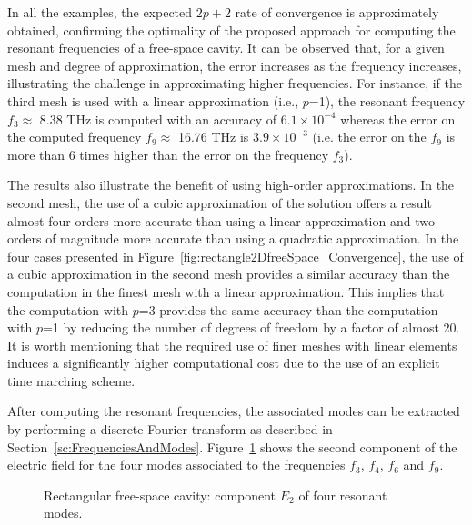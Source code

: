 In all the examples, the expected $2p+2$
rate of convergence is approximately obtained, confirming the optimality of the proposed approach for computing the resonant frequencies of a free-space cavity. It can be observed that, for a given mesh and degree of approximation, the error increases as the frequency increases, illustrating the challenge in approximating higher frequencies. For instance, if the third mesh is used with a linear approximation (i.e., $p$=1), the resonant frequency $f_3 \approx$  8.38 THz is computed with an accuracy of $6.1 \times 10^{-4}$ whereas the error on the computed frequency $f_9 \approx$ 16.76 THz is $3.9 \times 10^{-3}$ (i.e. the error on the $f_9$ is more than 6 times higher than the error on the frequency $f_3$).

The results also illustrate the benefit of using high-order approximations. In the second mesh, the use of a cubic approximation of the solution offers a result almost four orders more accurate than using a linear approximation and two orders of magnitude more accurate than using a quadratic approximation. In the four cases presented in Figure~\ref{fig:rectangle2DfreeSpace_Convergence}, the use of a cubic approximation in the second mesh provides a similar accuracy than the computation in the finest mesh with a linear approximation. This implies that the computation with $p$=3 provides the same accuracy than the computation with $p$=1 by reducing the number of degrees of freedom by a factor of almost 20. It is worth mentioning that the required use of finer meshes with linear elements induces a significantly higher computational cost due to the use of an explicit time marching scheme.

After computing the resonant frequencies, the associated modes can be extracted by performing a discrete Fourier transform as described in Section~\ref{sc:FrequenciesAndModes}. Figure~\ref{fig:rectangle2DfreeSpace_modes} shows the second component of the electric field for the four modes associated to the frequencies $f_3$, $f_4$, $f_6$ and $f_9$.
\begin{figure}[!ht]
	\centering
	\caption{Rectangular free-space cavity: component $E_2$ of four resonant modes.}
	\label{fig:rectangle2DfreeSpace_modes}
\end{figure}

